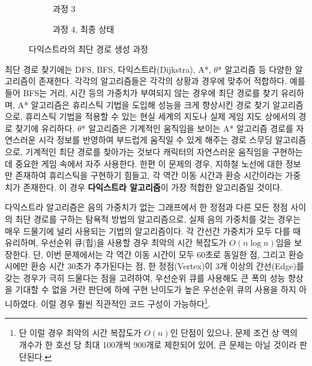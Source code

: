 \documentclass{article}
\begin{document}
\begin{figure}
\begin{subfigure} {0.5\textwidth}
    \caption{과정 3}
    \label{fig:graph_3}
\end{subfigure}
\hfill
\begin{subfigure} {0.5\textwidth}
    \centering
    \caption{과정 4, 최종 상태}
    \label{fig:graph_4}
\end{subfigure}
\caption{다익스트라의 최단 경로 생성 과정}
\label{graph_whole}
\end{figure}

최단 경로 찾기에는 DFS, BFS, 다익스트라(Dijkstra), A*, $\theta$* 알고리즘 등 다양한 알고리즘이 존재한다. 각각의 알고리즘들은 각각의 상황과 경우에 맞추어 적합하다. 예를 들어 BFS는 거리, 시간 등의 가중치가 부여되지 않는 경우에 최단 경로를 찾기 유리하며, A* 알고리즘은 휴리스틱 기법을 도입해 성능을 크게 향상시킨 경로 찾기 알고리즘으로, 휴리스틱 기법을 적용할 수 있는 현실 세계의 지도나 실제 게임 지도 상에서의 경로 찾기에 유리하다. $\theta$* 알고리즘은 기계적인 움직임을 보이는 A* 알고리즘 경로를 자연스러운 시각 정보를 반영하여 부드럽게 움직일 수 있게 해주는 경로 스무딩 알고리즘으로, 기계적인 최단 경로를 찾아가는 것보다 캐릭터의 자연스러운 움직임을 구현하는데 중요한 게임 속에서 자주 사용한다. 한편 이 문제의 경우, 지하철 노선에 대한 정보만 존재하여 휴리스틱을 구현하기 힘들고, 각 역간 이동 시간과 환승 시간이라는 가중치가 존재한다. 이 경우 \textbf{다익스트라 알고리즘}이 가장 적합한 알고리즘일 것이다.

다익스트라 알고리즘은 음의 가중치가 없는 그래프에서 한 정점과 다른 모든 정점 사이의 최단 경로를 구하는 탐욕적 방법의 알고리즘으로, 실제 음의 가중치를 갖는 경우는 매우 드물기에 널리 사용되는 기법의 알고리즘이다. 각 간선간 가중치가 모두 다를 때 유리하며, 우선순위 큐(힙)을 사용할 경우 최악의 시간 복잡도가 $\textit{O}(n\log{n})$임을 보장한다. 단, 이번 문제에서는 각 역간 이동 시간이 모두 60초로 동일한 점, 그리고 환승 시에만 환승 시간 30초가 추가된다는 점, 한 정점(Vertex)이 3개 이상의 간선(Edge)를 갖는 경우가 극히 드물다는 점을 고려하여, 우선순위 큐를 사용해도 큰 폭의 성능 향상을 기대할 수 없을 거란 판단에 하에 구현 난이도가 높은 우선순위 큐의 사용을 하지 아니하였다. 이럴 경우 훨씬 직관적인 코드 구성이 가능하다\footnote{단 이럴 경우 최악의 시간 복잡도가 $\textit{O}(n)$인 단점이 있으나, 문제 조건 상 역의 개수가 한 호선 당 최대 100개씩 900개로 제한되어 있어, 큰 문제는 아닐 것이라 판단된다.}.
\end{document}
